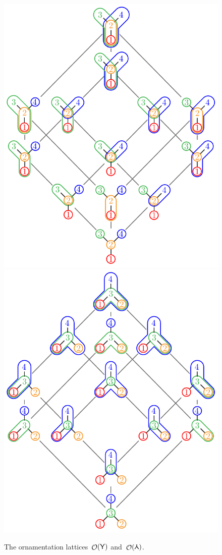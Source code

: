 \documentclass{amsart}
\theoremstyle{definition}
\renewcommand{\c}[1]{\mathcal{#1}} %
\DeclareMathOperator{\Orn}{\c{O}}  %
\newcommand{\Ygraph}{\sf Y} %
\newcommand{\Agraph}{\rotatebox[origin=c]{180}{\sf Y}} %
\begin{document}
\begin{figure}
	\centerline{\includegraphics[scale=.68]{ornamentationsY} \qquad \includegraphics[scale=.68]{ornamentationsA}}
	\caption{The ornamentation lattices~$\Orn(\Ygraph)$ and~$\Orn(\Agraph)$.}
	\label{fig:ornamentationsAY}
\end{figure}
\end{document}
